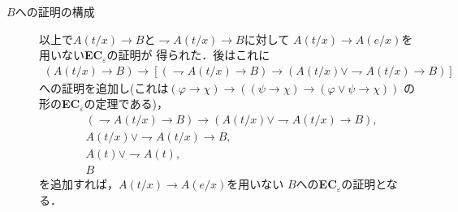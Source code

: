 \begin{description}
		\item[$B$への証明の構成]
			以上で$A(t/x) \rightarrow B$と$\rightharpoondown A(t/x) \rightarrow B$に対して
			$A(t/x) \rightarrow A(e/x)$を用いない{\bf EC}${}_{\varepsilon}$の証明が
			得られた．後はこれに
			\begin{align}
				(A(t/x) \rightarrow B) \rightarrow
				\left[ (\rightharpoondown A(t/x) \rightarrow B) \rightarrow
				(A(t/x) \vee \rightharpoondown A(t/x) \rightarrow B)\right]
			\end{align}
			への証明を追加し(これは$(\varphi \rightarrow \chi) \rightarrow
			((\psi \rightarrow \chi) \rightarrow 
			(\varphi \vee \psi \rightarrow \chi))$
			の形の{\bf EC}${}_{\varepsilon}$の定理である)，
			\begin{align}
				&(\rightharpoondown A(t/x) \rightarrow B) \rightarrow
				(A(t/x) \vee \rightharpoondown A(t/x) \rightarrow B), \\
				&A(t/x) \vee \rightharpoondown A(t/x) \rightarrow B, \\
				&A(t) \vee \rightharpoondown A(t), \\
				&B
			\end{align}
			を追加すれば，$A(t/x) \rightarrow A(e/x)$を用いない
			$B$への{\bf EC}${}_{\varepsilon}$の証明となる．
			\QED
	\end{description}